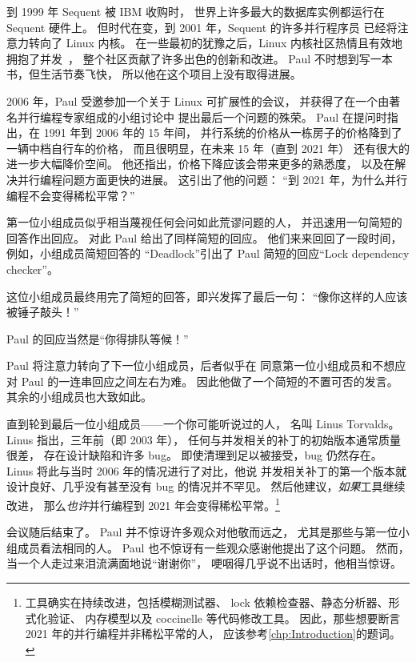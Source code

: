 到 1999 年 Sequent 被 IBM 收购时，
世界上许多最大的数据库实例都运行在 Sequent 硬件上。
但时代在变，到 2001 年，Sequent 的许多并行程序员
已经将注意力转向了 Linux 内核。
在一些最初的犹豫之后，Linux 内核社区热情且有效地
拥抱了并发~\cite{SilasBoydWickizer2010LinuxScales48,McKenney:2012:BEP:2414729.2414734}，
整个社区贡献了许多出色的创新和改进。
Paul 不时想到写一本书，但生活节奏飞快，
所以他在这个项目上没有取得进展。

2006 年，Paul 受邀参加一个关于 Linux 可扩展性的会议，
并获得了在一个由著名并行编程专家组成的小组讨论中
提出最后一个问题的殊荣。
Paul 在提问时指出，在 1991 年到 2006 年的 15 年间，
并行系统的价格从一栋房子的价格降到了一辆中档自行车的价格，
而且很明显，在未来 15 年（直到 2021 年）
还有很大的进一步大幅降价空间。
他还指出，价格下降应该会带来更多的熟悉度，
以及在解决并行编程问题方面更快的进展。
这引出了他的问题：
``到 2021 年，为什么并行编程不会变得稀松平常？''

第一位小组成员似乎相当蔑视任何会问如此荒谬问题的人，
并迅速用一句简短的回答作出回应。
对此 Paul 给出了同样简短的回应。
他们来来回回了一段时间，例如，小组成员简短回答的
``Deadlock''引出了 Paul 简短的回应``Lock dependency checker''。

这位小组成员最终用完了简短的回答，即兴发挥了最后一句：
``像你这样的人应该被锤子敲头！''

Paul 的回应当然是``你得排队等候！''

Paul 将注意力转向了下一位小组成员，后者似乎在
同意第一位小组成员和不想应对 Paul 的一连串回应之间左右为难。
因此他做了一个简短的不置可否的发言。
其余的小组成员也大致如此。

直到轮到最后一位小组成员——一个你可能听说过的人，
名叫 Linus Torvalds。
Linus 指出，三年前（即 2003 年），
任何与并发相关的补丁的初始版本通常质量很差，
存在设计缺陷和许多 bug。
即使清理到足以被接受，bug 仍然存在。
Linus 将此与当时 2006 年的情况进行了对比，他说
并发相关补丁的第一个版本就设计良好、几乎没有甚至没有 bug
的情况并不罕见。
然后他建议，\emph{如果}工具继续改进，
那么\emph{也许}并行编程到 2021 年会变得稀松平常。\footnote{
	工具确实在持续改进，包括模糊测试器、
	lock 依赖检查器、静态分析器、形式化验证、
	内存模型以及 coccinelle 等代码修改工具。
	因此，那些想要断言 2021 年的并行编程并非稀松平常的人，
	应该参考\cref{chp:Introduction}的题词。}

会议随后结束了。
Paul 并不惊讶许多观众对他敬而远之，
尤其是那些与第一位小组成员看法相同的人。
Paul 也不惊讶有一些观众感谢他提出了这个问题。
然而，当一个人走过来泪流满面地说``谢谢你''，
哽咽得几乎说不出话时，他相当惊讶。

